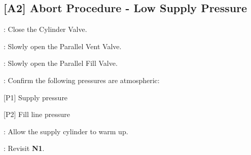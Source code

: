 \subsection{[A2] Abort Procedure - Low Supply Pressure}
\begin{checklist}
    \item \primary{}: Close the Cylinder Valve.
    \item \primary{}: Slowly open the Parallel Vent Valve.
    \item \primary{}: Slowly open the Parallel Fill Valve.
    \item \control{}: Confirm the following pressures are atmospheric:
    \begin{checklist}
        \item {[P1]} Supply pressure
        \item {[P2]} Fill line pressure
    \end{checklist}
    \item \primary{}: Allow the supply cylinder to warm up.
    \item \ops{}: Revisit \textbf{N1}.
\end{checklist}
\setcounter{checklistnum}{0}

